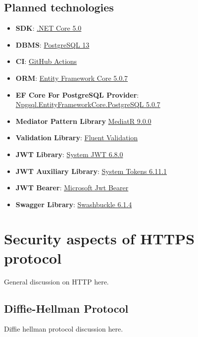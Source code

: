 \subsection{Planned technologies}\label{subsec:planned-technologies}
\begin{itemize}
    \item \textbf{SDK}: \href{https://dotnet.microsoft.com/download/dotnet/5.0}{.NET Core 5.0}
    \item \textbf{DBMS}: \href{https://www.postgresql.org/}{PostgreSQL 13}
    \item \textbf{CI}: \href{https://docs.github.com/en/actions}{GitHub Actions}
    \item \textbf{ORM}: \href{https://www.nuget.org/packages/Microsoft.EntityFrameworkCore/5.0.7?_src=template}{Entity Framework Core 5.0.7}
    \item \textbf{EF Core For PostgreSQL Provider}: \href{https://www.nuget.org/packages/Npgsql.EntityFrameworkCore.PostgreSQL/5.0.7?_src=template}{Npgsql.EntityFrameworkCore.PostgreSQL 5.0.7}
    \item \textbf{Mediator Pattern Library} \href{https://www.nuget.org/packages/MediatR/9.0.0?_src=template}{MediatR 9.0.0}
    \item \textbf{Validation Library}: \href{https://www.nuget.org/packages/FluentValidation/10.2.3?_src=template}{Fluent Validation}
    \item \textbf{JWT Library}: \href{https://www.nuget.org/packages/System.IdentityModel.Tokens.Jwt}{System JWT 6.8.0}
    \item \textbf{JWT Auxiliary Library}: \href{https://www.nuget.org/packages/System.IdentityModel.Tokens}{System Tokens 6.11.1}
    \item \textbf{JWT Bearer}: \href{https://www.nuget.org/packages/Microsoft.AspNetCore.Authentication.JwtBearer/5.0.7?_src=template}{Microsoft Jwt Bearer}
    \item \textbf{Swagger Library}: \href{https://www.nuget.org/packages/Swashbuckle.AspNetCore/5.6.3?_src=template}{Swashbuckle 6.1.4}
\end{itemize}
\section{Security aspects of HTTPS protocol}\label{sec:security-aspects-of-https-protocol}
General discussion on HTTP here.

\subsection{Diffie-Hellman Protocol}\label{subsec:diffie-hellman-protocol}
Diffie hellman protocol discussion here.
